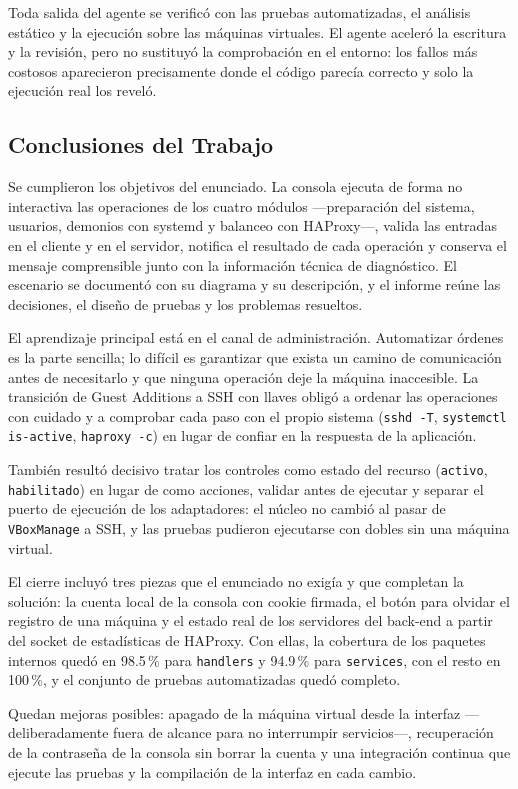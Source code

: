 Toda salida del agente se verificó con las pruebas automatizadas, el
análisis estático y la ejecución sobre las máquinas virtuales. El agente
aceleró la escritura y la revisión, pero no sustituyó la comprobación en
el entorno: los fallos más costosos aparecieron precisamente donde el
código parecía correcto y solo la ejecución real los reveló.

\subsection{Conclusiones del Trabajo}
\label{sec:conclusiones}

Se cumplieron los objetivos del enunciado. La consola ejecuta de forma no
interactiva las operaciones de los cuatro módulos ---preparación del
sistema, usuarios, demonios con systemd y balanceo con HAProxy---, valida
las entradas en el cliente y en el servidor, notifica el resultado de
cada operación y conserva el mensaje comprensible junto con la
información técnica de diagnóstico. El escenario se documentó con su
diagrama y su descripción, y el informe reúne las decisiones, el diseño
de pruebas y los problemas resueltos.

El aprendizaje principal está en el canal de administración. Automatizar
órdenes es la parte sencilla; lo difícil es garantizar que exista un
camino de comunicación antes de necesitarlo y que ninguna operación deje
la máquina inaccesible. La transición de Guest Additions a SSH con llaves
obligó a ordenar las operaciones con cuidado y a comprobar cada paso con
el propio sistema (\texttt{sshd -T}, \texttt{systemctl is-active},
\texttt{haproxy -c}) en lugar de confiar en la respuesta de la
aplicación.

También resultó decisivo tratar los controles como estado del recurso
(\texttt{activo}, \texttt{habilitado}) en lugar de como acciones, validar
antes de ejecutar y separar el puerto de ejecución de los adaptadores: el
núcleo no cambió al pasar de \texttt{VBoxManage} a SSH, y las pruebas
pudieron ejecutarse con dobles sin una máquina virtual.

El cierre incluyó tres piezas que el enunciado no exigía y que
completan la solución: la cuenta local de la consola con cookie firmada,
el botón para olvidar el registro de una máquina y el estado real de los
servidores del back-end a partir del socket de estadísticas de HAProxy.
Con ellas, la cobertura de los paquetes internos quedó en 98.5\,\% para
\texttt{handlers} y 94.9\,\% para \texttt{services}, con el resto en
100\,\%, y el conjunto de pruebas automatizadas quedó completo.

Quedan mejoras posibles: apagado de la máquina virtual desde la interfaz
---deliberadamente fuera de alcance para no interrumpir servicios---,
recuperación de la contraseña de la consola sin borrar la cuenta y una
integración continua que ejecute las pruebas y la compilación de la
interfaz en cada cambio.
